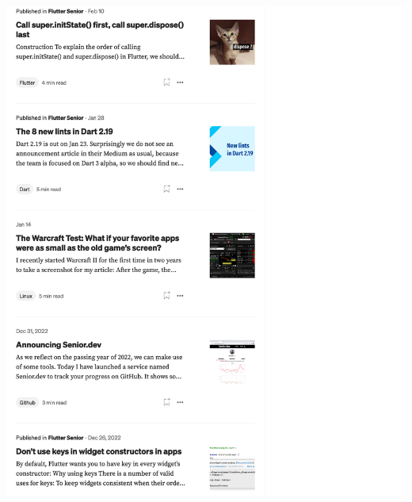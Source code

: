 \Continuing
\begin{center}
    \includegraphics[width=40em]{medium-articles-p6}
\end{center}
\WillContinue
\pagebreak

